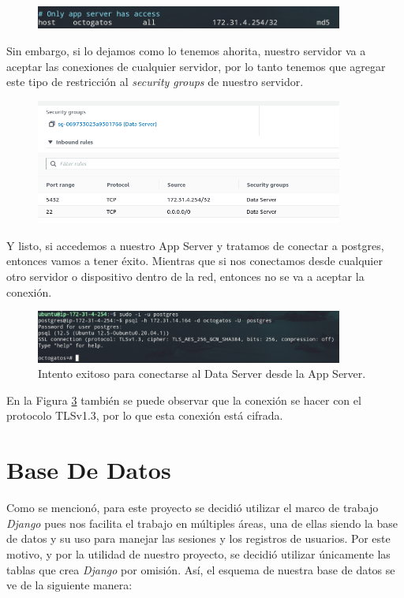 \documentclass{article}
\begin{document}
\begin{figure}[H]
  \centering
  \includegraphics[width=0.9\textwidth]{DATASERVER/exhibitJ}
  \label{fig:DATASERVER-J}
\end{figure}

Sin embargo, si lo dejamos como lo tenemos ahorita, nuestro
servidor va a aceptar las conexiones de cualquier servidor,
por lo tanto tenemos que agregar este tipo de restricción
al \textit{security groups} de nuestro servidor.

\begin{figure}[H]
  \centering
  \includegraphics[width=0.9\textwidth]{DATASERVER/exhibitK}
  \label{fig:DATASERVER-K}
\end{figure}

Y listo, si accedemos a nuestro App Server y tratamos de
conectar a postgres, entonces vamos a tener éxito. Mientras
que si nos conectamos desde cualquier otro servidor o
dispositivo dentro de la red, entonces no se va a aceptar la
conexión.

\begin{figure}[H]
  \centering
  \includegraphics[width=0.9\textwidth]{DATASERVER/exhibitL}
  \caption{Intento exitoso para conectarse al Data Server desde la App Server.}
  \label{fig:DATASERVER-L}
\end{figure}

En la Figura \ref{fig:DATASERVER-L} tambi\'en se
puede observar que la conexi\'on se hacer con el protocolo
TLSv1.3, por lo que esta conexi\'on est\'a cifrada.


\section{Base De Datos}
Como se mencionó, para este proyecto se decidió utilizar
el marco de trabajo \textit{Django} pues nos facilita el
trabajo en múltiples áreas, una de ellas siendo la base
de datos y su uso para manejar las sesiones y los registros
de usuarios. Por este motivo, y por la utilidad de nuestro
proyecto, se decidió utilizar únicamente las tablas que crea
\textit{Django} por omisión. Así, el esquema de
nuestra base de datos se ve de la siguiente manera:
\end{document}

